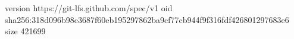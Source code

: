 version https://git-lfs.github.com/spec/v1
oid sha256:318d096b98c3687f60eb195297862ba9cf77cb944f9f316fdf426801297683e6
size 421699
